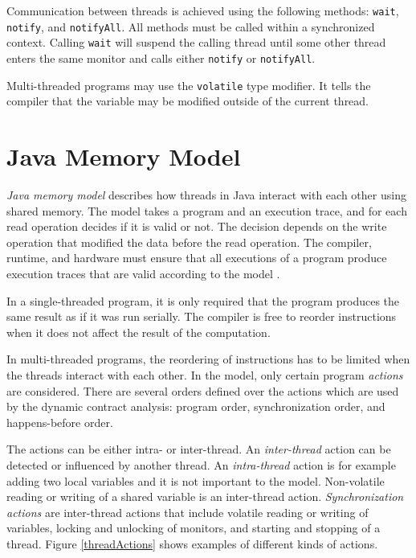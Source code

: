 Communication between threads is achieved using the following methods:
\texttt{wait}, \texttt{notify}, and \texttt{notifyAll}. All methods must be
called within a synchronized context. Calling \texttt{wait} will suspend the
calling thread until some other thread enters the same monitor and calls either
\texttt{notify} or \texttt{notifyAll}.

Multi-threaded programs may use the \texttt{volatile} type modifier. It tells
the compiler that the variable may be modified outside of the current thread.

\section{Java Memory Model}


\emph{Java memory model} describes how threads in Java interact with each other
using shared memory. The model takes a program and an execution trace, and for
each read operation decides if it is valid or not. The decision depends on the
write operation that modified the data before the read operation. The compiler,
runtime, and hardware must ensure that all executions of a program produce
execution traces that are valid according to the model \cite{jmmspec}.

In a single-threaded program, it is only required that the program produces the
same result as if it was run serially. The compiler is free to reorder
instructions when it does not affect the result of the computation.

In multi-threaded programs, the reordering of instructions has to be limited
when the threads interact with each other. In the model, only certain program
\emph{actions} are considered. There are several orders defined over the actions
which are used by the dynamic contract analysis: program order, synchronization
order, and happens-before order.

The actions can be either intra- or inter-thread. An \emph{inter-thread} action
can be detected or influenced by another thread. An \emph{intra-thread} action
is for example adding two local variables and it is not important to the model.
Non-volatile reading or writing of a shared variable is an inter-thread action.
\emph{Synchronization actions} are inter-thread actions that include volatile
reading or writing of variables, locking and unlocking of monitors, and starting
and stopping of a thread. Figure \ref{threadActions} shows examples of different
kinds of actions.


